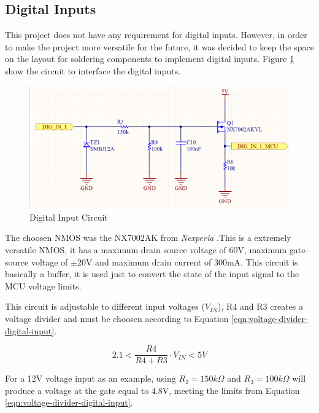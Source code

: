 	\subsection{Digital Inputs}\label{ssec:digital-inputs}

		This project does not have any requirement for digital inputs. However, in order to make the project more versatile for the future, it was decided to keep the space on the layout for soldering components to implement digital inputs. Figure \ref{fig:digital-input-circuit} show the circuit to interface the digital inputs.

			\begin{figure}[htbp]
				\centering
				\includegraphics[scale=1]{figuras/fig-digital-input-circuit.png}
				\caption{Digital Input Circuit \cite{digital-input-circuit}}
				\label{fig:digital-input-circuit}
			\end{figure}

		The choosen NMOS was the NX7002AK from \textit{Nexperia} \cite{nx7002ak-datasheet}.This is a extremely versatile NMOS, it has a maximum drain source voltage of 60V, maximum gate-source voltage of $\pm$20V and maximum drain current of 300mA. This circuit is basically a buffer, it is used just to convert the state of the input signal to the MCU voltage limits. 

		This circuit is adjustable to different input voltages ($V_{IN}$), R4 and R3 creates a voltage divider and must be choosen according to Equation \ref{eqn:voltage-divider-digital-input}.

		\begin{equation}\label{eqn:voltage-divider-digital-input}
			2.1 < \frac{R4}{R4 + R3} \cdot V_{IN} < 5V
		\end{equation}

		For a 12V voltage input as an example, using $R_{2}=150k\Omega$ and $R_{3}=100k\Omega$ will produce a voltage at the gate equal to 4.8V, meeting the limits from Equation \ref{eqn:voltage-divider-digital-input}.

